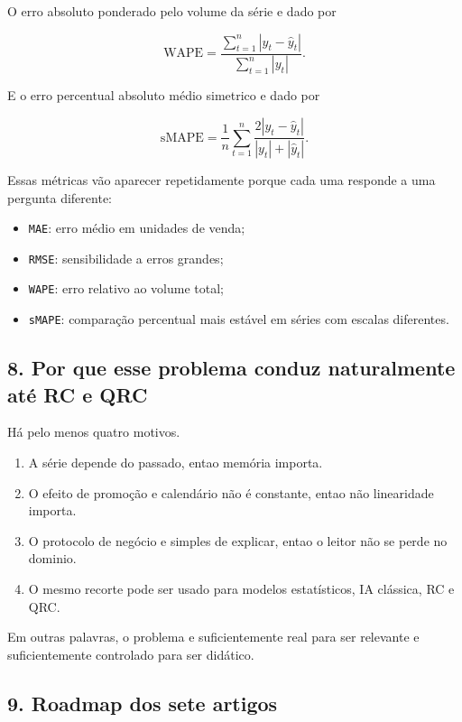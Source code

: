 \documentclass[12pt]{article}
\providecommand{\tightlist}{%
          \setlength{\itemsep}{0pt}\setlength{\parskip}{0pt}}
\begin{document}
O erro absoluto ponderado pelo volume da série e dado por

\[
\mathrm{WAPE} = \frac{\sum_{t=1}^n |y_t - \hat{y}_t|}{\sum_{t=1}^n |y_t|}.
\]

E o erro percentual absoluto médio simetrico e dado por

\[
\mathrm{sMAPE} = \frac{1}{n} \sum_{t=1}^n
\frac{2 |y_t - \hat{y}_t|}{|y_t| + |\hat{y}_t|}.
\]

Essas métricas vão aparecer repetidamente porque cada uma responde a uma pergunta diferente:

\begin{itemize}
\tightlist
\item
  \texttt{MAE}: erro médio em unidades de venda;
\item
  \texttt{RMSE}: sensibilidade a erros grandes;
\item
  \texttt{WAPE}: erro relativo ao volume total;
\item
  \texttt{sMAPE}: comparação percentual mais estável em séries com escalas diferentes.
\end{itemize}

\subsection{8. Por que esse problema conduz naturalmente até RC e QRC}\label{8-por-que-esse-problema-conduz-naturalmente-atuxe9-rc-e-qrc}

Há pelo menos quatro motivos.

\begin{enumerate}
\def\labelenumi{\arabic{enumi}.}
\tightlist
\item
  A série depende do passado, entao memória importa.
\item
  O efeito de promoção e calendário não é constante, entao não linearidade importa.
\item
  O protocolo de negócio e simples de explicar, entao o leitor não se perde no dominio.
\item
  O mesmo recorte pode ser usado para modelos estatísticos, IA clássica, RC e QRC.
\end{enumerate}

Em outras palavras, o problema e suficientemente real para ser relevante e suficientemente controlado para ser didático.

\subsection{9. Roadmap dos sete artigos}\label{9-roadmap-dos-sete-artigos}
\end{document}
